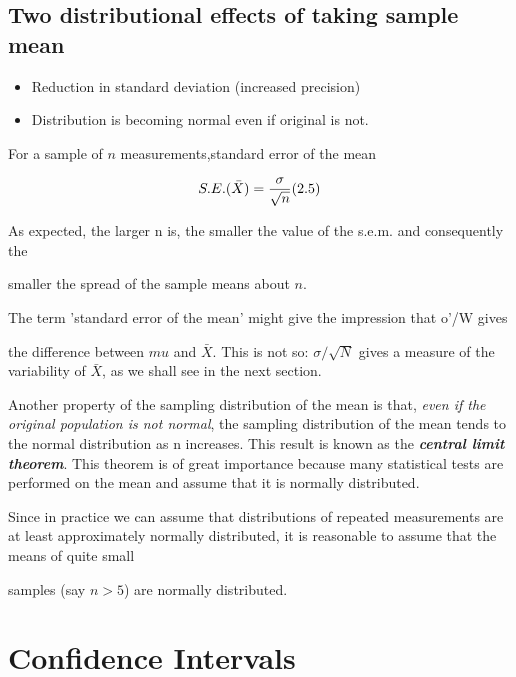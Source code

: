  

\subsection{Two distributional effects of taking sample mean}

\begin{itemize}

\item Reduction in standard deviation (increased precision)

\item Distribution is becoming normal even if original is not.

\end{itemize}

For a sample of $n$ measurements,standard error of the mean

\[S.E.(\bar{X}) = {\sigma \over \sqrt{n}} (2.5)\]

 

As expected, the larger n is, the smaller the value of the s.e.m. and consequently the

smaller the spread of the sample means about $n$.

The term 'standard error of the mean' might give the impression that o'/W gives

the difference between $mu$ and $\bar{X}$. This is not so: $\sigma / \sqrt{N}$ gives a measure of the variability of $\bar{X}$, as we shall see in the next section.

 

Another property of the sampling distribution of the mean is that, \emph{even if the original population is not normal}, the sampling distribution of the mean tends to the normal distribution as n increases. This result is known as the \emph{\textbf{central limit theorem}}. This theorem is of great importance because many statistical tests are performed on the mean and assume that it is normally distributed.

 

Since in practice we can assume that distributions of repeated measurements are at least approximately normally distributed, it is reasonable to assume that the means of quite small

samples (say $n>5$) are normally distributed.

 



\section{Confidence Intervals}

